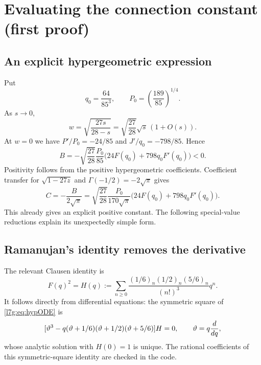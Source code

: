 \documentclass[11pt,letterpaper]{article}
\theoremstyle{remark}\newtheorem{remark}[theorem]{Remark}
\newcounter{l7gtrsavedeq}
\begin{document}
\section{Evaluating the connection constant (first proof)}\label{l7g:sec:evaluation}
\subsection{An explicit hypergeometric expression}
Put
\begin{equation}\label{l7g:eq:q0}
 q_0=\frac{64}{85^3},\qquad P_0=\left(\frac{189}{85}\right)^{1/4}.
\end{equation}
As $s\to0$,
\[
 w=\sqrt{\frac{27s}{28-s}}
   =\sqrt{\frac{27}{28}}\sqrt s\,(1+O(s)).
\]
At $w=0$ we have $P'/P_0=-24/85$ and $J'/q_0=-798/85$. Hence
\begin{equation}\label{l7g:eq:B}
 B=-\sqrt{\frac{27}{28}}\frac{P_0}{85}
           \bigl(24F(q_0)+798q_0F'(q_0)\bigr)<0.
\end{equation}
Positivity follows from the positive hypergeometric coefficients.
Coefficient transfer for $\sqrt{1-27z}$ and
$\Gamma(-1/2)=-2\sqrt\pi$ gives
\begin{equation}\label{l7g:eq:Chyper}
 C=-\frac{B}{2\sqrt\pi}
 =\sqrt{\frac{27}{28}}\frac{P_0}{170\sqrt\pi}
      \bigl(24F(q_0)+798q_0F'(q_0)\bigr).
\end{equation}
This already gives an explicit positive constant. The following
special-value reductions explain its unexpectedly simple form.

\subsection{Ramanujan's identity removes the derivative}
The relevant Clausen identity is
\begin{equation}\label{l7g:eq:Clausen}
 F(q)^2=H(q):=\sum_{n\ge0}
      \frac{(1/6)_n(1/2)_n(5/6)_n}{(n!)^3}q^n.
\end{equation}
It follows directly from differential equations: the symmetric square
of \eqref{l7g:eq:hypODE} is
\[
 [\vartheta^3-q(\vartheta+1/6)(\vartheta+1/2)(\vartheta+5/6)]H=0,
 \qquad\vartheta=q\frac{d}{dq},
\]
whose analytic solution with $H(0)=1$ is unique. The rational
coefficients of this symmetric-square identity are checked in the code.
\end{document}
